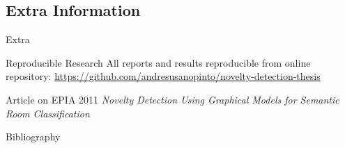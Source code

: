 \documentclass[compress]{beamer}
\begin{document}
\subsection{Extra Information}
\begin{frame}{Extra}
\begin{block}{Reproducible Research}
All reports and results reproducible from online repository:
\url{https://github.com/andresusanopinto/novelty-detection-thesis}
\end{block}

\begin{block}{Article on EPIA 2011}
\textit{Novelty Detection Using Graphical Models for Semantic Room Classification}
\end{block}
\end{frame}

\appendix
\begin{frame}[allowframebreaks]{Bibliography}


\end{frame}

\begin{frame}
 \titlepage
\end{frame}
\end{document}
